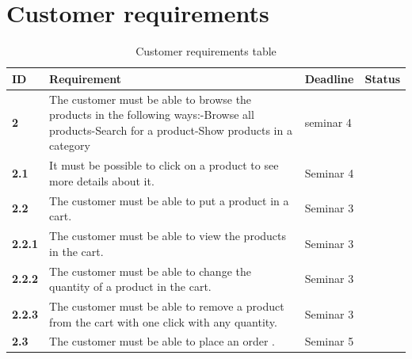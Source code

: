 \documentclass[a4paper,12pt]{article}
\begin{document}
\section{Customer requirements}
\begin{table}[htbp]
	\centering
	\caption{Customer requirements table}
	\label{my-label}
	\begin{tabular}{|l|L{8cm}|L{2.5cm}|L{2.5cm}|}
		\hline
		\textbf{ID}    & \textbf{Requirement}                                                                                                                                                                          & Deadline & Status \\ \hline
		\textbf{2}     & The customer must be able to browse the products in the following ways:\newline -Browse all products\newline -Search for a product\newline -Show products in a category &  seminar 4       &        \\ \hline
		\textbf{2.1}   & It must be possible to click on a product to see more details about it.                                                                                                                       &    Seminar 4      &        \\ \hline
		\textbf{2.2}   & The customer must be able to put a product in a cart.                                                                                                                                         &   Seminar 3       &        \\ \hline
		\textbf{2.2.1} & The customer must be able to view the products in the cart.                                                                                                                                   &     Seminar 3    &        \\ \hline
		\textbf{2.2.2} & The customer must be able to change the quantity of a product in the cart.                                                                                                              &   Seminar 3       &        \\ \hline
		\textbf{2.2.3} & The customer must be able to remove a product from the cart with one click with any quantity.                                                     &     Seminar 3     &        \\ \hline
		\textbf{2.3}   & The customer must be able to place an order   .                                                                                                                                               &     Seminar 5     &        \\ \hline

\end{tabular}
\end{table}
\end{document}
